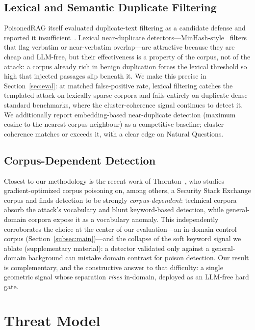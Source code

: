 \documentclass[10pt,journal,compsoc]{IEEEtran}
\begin{document}
\subsection{Lexical and Semantic Duplicate Filtering}
PoisonedRAG itself evaluated duplicate-text filtering as a candidate defense and
reported it insufficient~\cite{poisonedrag}. Lexical near-duplicate
detectors---MinHash-style~\cite{minhash} filters that
flag verbatim or near-verbatim overlap---are attractive because they are cheap and
LLM-free, but their effectiveness is
a property of the corpus, not of the attack: a corpus already rich in benign
duplication forces the lexical threshold so high that injected passages slip
beneath it. We make this precise in Section~\ref{sec:eval}: at matched
false-positive rate, lexical filtering catches the templated attack on lexically
sparse corpora and fails entirely on duplicate-dense standard benchmarks, where
the cluster-coherence signal continues to detect it.
We additionally report embedding-based near-duplicate detection (maximum cosine
to the nearest corpus neighbour) as a competitive baseline; cluster coherence
matches or exceeds it, with a clear edge on Natural Questions.

\subsection{Corpus-Dependent Detection}
Closest to our methodology is the recent work of Thornton~\cite{thornton2026},
who studies gradient-optimized corpus poisoning on, among others, a Security Stack
Exchange corpus and finds detection to be strongly \emph{corpus-dependent}:
technical corpora absorb the attack's vocabulary and blunt keyword-based
detection, while general-domain corpora expose it as a vocabulary anomaly. This
independently corroborates the choice at the center of our evaluation---an
in-domain control corpus (Section~\ref{subsec:main})---and the collapse of the
soft keyword signal we ablate (supplementary material): a detector validated only
against a general-domain background can mistake domain contrast for poison
detection. Our result is complementary, and the constructive answer to that
difficulty: a single geometric signal whose separation \emph{rises} in-domain,
deployed as an LLM-free hard gate.

\section{Threat Model}
\label{sec:threat}
\end{document}
